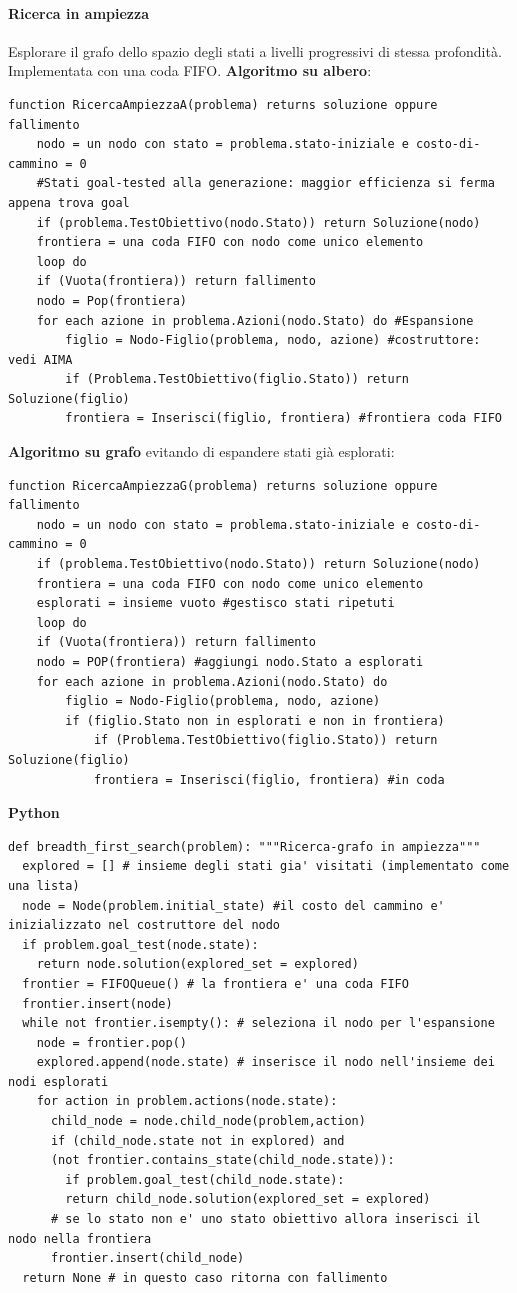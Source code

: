 \documentclass[10pt]{book}
\begin{document}
\paragraph{Ricerca in ampiezza} Esplorare il grafo dello spazio degli stati a livelli progressivi di stessa profondità. Implementata con una coda FIFO. \textbf{Algoritmo su albero}:
\begin{lstlisting}
function RicercaAmpiezzaA(problema)	returns soluzione oppure fallimento
	nodo = un nodo con stato = problema.stato-iniziale e costo-di-cammino = 0
	#Stati goal-tested alla generazione: maggior efficienza si ferma appena trova goal
	if (problema.TestObiettivo(nodo.Stato)) return Soluzione(nodo)
	frontiera = una coda FIFO con nodo come unico elemento
	loop do
	if (Vuota(frontiera)) return fallimento
	nodo = Pop(frontiera)
	for each azione in problema.Azioni(nodo.Stato) do #Espansione
		figlio = Nodo-Figlio(problema, nodo, azione) #costruttore: vedi AIMA
		if (Problema.TestObiettivo(figlio.Stato)) return Soluzione(figlio)
		frontiera = Inserisci(figlio, frontiera) #frontiera coda FIFO
\end{lstlisting}
\pagebreak
\textbf{Algoritmo su grafo} evitando di espandere stati già esplorati:
\begin{lstlisting}
function RicercaAmpiezzaG(problema) returns soluzione oppure fallimento
	nodo = un nodo con stato = problema.stato-iniziale e costo-di-cammino = 0
	if (problema.TestObiettivo(nodo.Stato)) return Soluzione(nodo)
	frontiera = una coda FIFO con nodo come unico elemento
	esplorati = insieme vuoto #gestisco stati ripetuti
	loop do
	if (Vuota(frontiera)) return fallimento
	nodo = POP(frontiera) #aggiungi nodo.Stato a esplorati
	for each azione in problema.Azioni(nodo.Stato) do
		figlio = Nodo-Figlio(problema, nodo, azione)
		if (figlio.Stato non in esplorati e non in frontiera)
			if (Problema.TestObiettivo(figlio.Stato)) return Soluzione(figlio)
			frontiera = Inserisci(figlio, frontiera) #in coda
\end{lstlisting}

\textbf{Python}
\begin{lstlisting}
def breadth_first_search(problem): """Ricerca-grafo in ampiezza"""
  explored = [] # insieme degli stati gia' visitati (implementato come una lista)
  node = Node(problem.initial_state) #il costo del cammino e' inizializzato nel costruttore del nodo
  if problem.goal_test(node.state):
    return node.solution(explored_set = explored)
  frontier = FIFOQueue() # la frontiera e' una coda FIFO
  frontier.insert(node)
  while not frontier.isempty(): # seleziona il nodo per l'espansione
    node = frontier.pop()
    explored.append(node.state) # inserisce il nodo nell'insieme dei nodi esplorati
    for action in problem.actions(node.state):
      child_node = node.child_node(problem,action)
      if (child_node.state not in explored) and
      (not frontier.contains_state(child_node.state)):
        if problem.goal_test(child_node.state):
        return child_node.solution(explored_set = explored)
      # se lo stato non e' uno stato obiettivo allora inserisci il nodo nella frontiera
      frontier.insert(child_node)
  return None # in questo caso ritorna con fallimento
\end{lstlisting}
\end{document}
